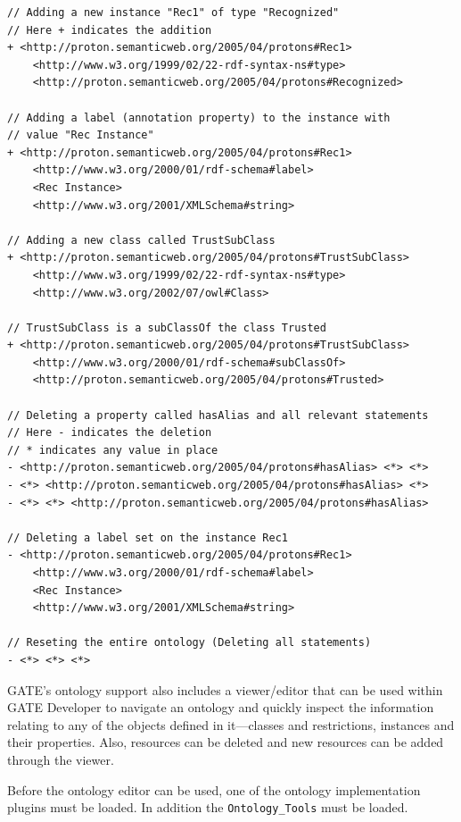 {\begin{small}
\begin{verbatim}
// Adding a new instance "Rec1" of type "Recognized"
// Here + indicates the addition
+ <http://proton.semanticweb.org/2005/04/protons#Rec1> 
	<http://www.w3.org/1999/02/22-rdf-syntax-ns#type> 
	<http://proton.semanticweb.org/2005/04/protons#Recognized>

// Adding a label (annotation property) to the instance with 
// value "Rec Instance"
+ <http://proton.semanticweb.org/2005/04/protons#Rec1> 
	<http://www.w3.org/2000/01/rdf-schema#label> 
	<Rec Instance> 
	<http://www.w3.org/2001/XMLSchema#string>

// Adding a new class called TrustSubClass
+ <http://proton.semanticweb.org/2005/04/protons#TrustSubClass> 
	<http://www.w3.org/1999/02/22-rdf-syntax-ns#type> 
	<http://www.w3.org/2002/07/owl#Class>

// TrustSubClass is a subClassOf the class Trusted
+ <http://proton.semanticweb.org/2005/04/protons#TrustSubClass> 
	<http://www.w3.org/2000/01/rdf-schema#subClassOf> 
	<http://proton.semanticweb.org/2005/04/protons#Trusted>

// Deleting a property called hasAlias and all relevant statements
// Here - indicates the deletion
// * indicates any value in place
- <http://proton.semanticweb.org/2005/04/protons#hasAlias> <*> <*>
- <*> <http://proton.semanticweb.org/2005/04/protons#hasAlias> <*>
- <*> <*> <http://proton.semanticweb.org/2005/04/protons#hasAlias>

// Deleting a label set on the instance Rec1
- <http://proton.semanticweb.org/2005/04/protons#Rec1> 
	<http://www.w3.org/2000/01/rdf-schema#label> 
	<Rec Instance>
	<http://www.w3.org/2001/XMLSchema#string>

// Reseting the entire ontology (Deleting all statements)
- <*> <*> <*>

\end{verbatim}\end{small}



GATE's ontology support also includes a viewer/editor that can be used
within GATE Developer to navigate an ontology and quickly inspect the
information relating to any of the objects defined in it---classes and
restrictions, instances and their properties. Also, resources can be
deleted and new resources can be added through the viewer.

Before the ontology editor can be used, one of the ontology
implementation plugins must be loaded. In addition the 
\verb!Ontology_Tools! must be loaded.

}
